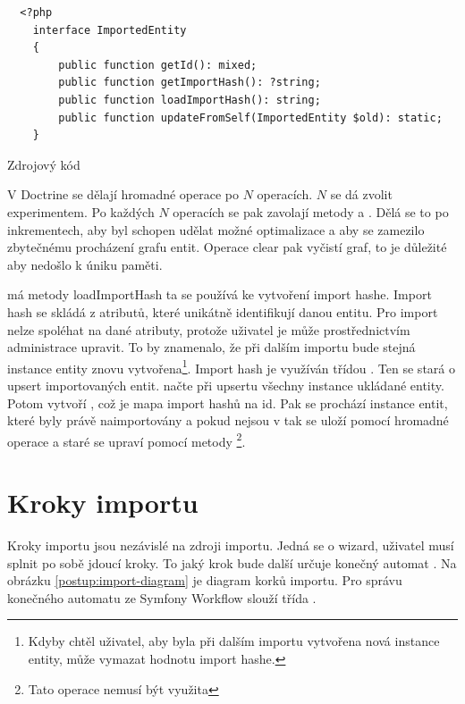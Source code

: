 \begin{code}[H]
\begin{verbatim}
  <?php
    interface ImportedEntity
    {
        public function getId(): mixed;
        public function getImportHash(): ?string;   
        public function loadImportHash(): string;   
        public function updateFromSelf(ImportedEntity $old): static;
    }
\end{verbatim}
\caption{Zdrojový kód }
\end{code}

V Doctrine se dělají hromadné operace po $N$ operacích. $N$ se dá zvolit experimentem.
Po každých $N$ operacích se pak zavolají metody  a . Dělá se to po inkrementech, aby  byl schopen udělat možné optimalizace a aby se zamezilo zbytečnému procházení grafu entit. Operace clear pak vyčistí graf, to je důležité aby nedošlo k úniku paměti.

 má metody loadImportHash ta se používá ke vytvoření import hashe. Import hash se skládá z atributů, které unikátně identifikují danou entitu. Pro import nelze spoléhat na dané atributy, protože uživatel je může prostřednictvím administrace upravit. To by znamenalo, že při dalším importu bude stejná instance entity znovu vytvořena\footnote{Kdyby chtěl uživatel, aby byla při dalším importu vytvořena nová instance entity, může vymazat hodnotu import hashe.}.
Import hash je využíván třídou . Ten se stará o upsert importovaných entit.
 načte při upsertu všechny instance ukládané entity.
Potom vytvoří , což je mapa import hashů na id.
Pak se prochází instance entit, které byly právě naimportovány a pokud nejsou v  tak se uloží pomocí hromadné operace a staré  se upraví pomocí metody \footnote{Tato operace nemusí být využita}.


\section{Kroky importu}

Kroky importu jsou nezávislé na zdroji importu. 
Jedná se o wizard, uživatel musí splnit po sobě jdoucí kroky. To jaký krok bude další určuje konečný automat .
Na obrázku \ref{postup:import-diagram} je diagram korků importu.
Pro správu konečného automatu ze Symfony Workflow slouží třída .

